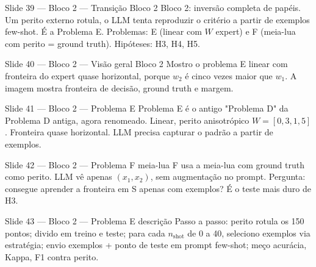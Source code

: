 \documentclass[aspectratio=169,10pt]{beamer}
\begin{document}
\begin{frame}{Slide 39 --- Bloco 2 --- Transi\c{c}\~ao Bloco 2}
\footnotesize
Bloco 2: invers\~ao completa de pap\'eis. Um perito externo rotula, o LLM tenta reproduzir o crit\'erio a partir de exemplos few-shot. \'E a Problema E. Problemas: E (linear com $W$ expert) e F (meia-lua com perito = ground truth). Hip\'oteses: H3, H4, H5.
\end{frame}

\begin{frame}{Slide 40 --- Bloco 2 --- Vis\~ao geral Bloco 2}
\footnotesize
Mostro o problema E linear com fronteira do expert quase horizontal, porque $w_2$ \'e cinco vezes maior que $w_1$. A imagem mostra fronteira de decis\~ao, ground truth e margem.
\end{frame}

\begin{frame}{Slide 41 --- Bloco 2 --- Problema E}
\footnotesize
Problema E \'e o antigo "Problema D" da Problema D antiga, agora renomeado. Linear, perito anisotr\'opico $W=[0{,}3, 1{,}5]$. Fronteira quase horizontal. LLM precisa capturar o padr\~ao a partir de exemplos.
\end{frame}

\begin{frame}{Slide 42 --- Bloco 2 --- Problema F meia-lua}
\footnotesize
F usa a meia-lua com ground truth como perito. LLM v\^e apenas $(x_1, x_2)$, sem augmenta\c{c}\~ao no prompt. Pergunta: consegue aprender a fronteira em S apenas com exemplos? \'E o teste mais duro de H3.
\end{frame}

\begin{frame}{Slide 43 --- Bloco 2 --- Problema E descri\c{c}\~ao}
\footnotesize
Passo a passo: perito rotula os 150 pontos; divido em treino e teste; para cada $n_{\text{shot}}$ de 0 a 40, seleciono exemplos via estrat\'egia; envio exemplos + ponto de teste em prompt few-shot; me\c{c}o acur\'acia, Kappa, F1 contra perito.
\end{frame}
\end{document}
